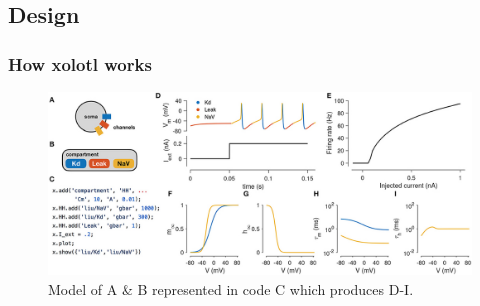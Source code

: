 \documentclass{beamer}
\begin{document}
\subsection{Design}


\begin{frame}
  \frametitle{How xolotl works}

  \begin{figure}
    \includegraphics[width=\textwidth]{gfx/fig1.jpg}
    \caption{Model of A \& B represented in code C which produces D-I.}
  \end{figure}

\end{frame}

\end{document}
